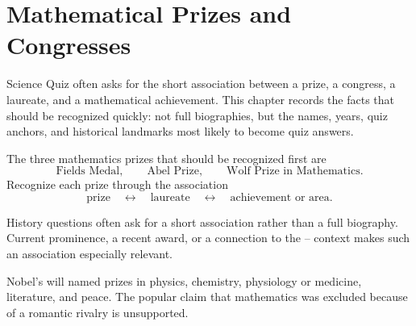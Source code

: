     \chapter{Mathematical Prizes and Congresses}

    Science Quiz often asks for the short association between a prize, a
    congress, a laureate, and a mathematical achievement. This chapter records
    the facts that should be recognized quickly: not full biographies, but the
    names, years, quiz anchors, and historical landmarks most likely to become quiz
    answers.

    \begin{fact}
        The three mathematics prizes that should be recognized first are
        \[
            \text{Fields Medal},\qquad
            \text{Abel Prize},\qquad
            \text{Wolf Prize in Mathematics}.
        \]
        Recognize each prize through the association
        \[
            \text{prize}
            \quad\longleftrightarrow\quad
            \text{laureate}
            \quad\longleftrightarrow\quad
            \text{achievement or area}.
        \]
    \end{fact}

    \begin{strategy}
        History questions often ask for a short association rather than a full
        biography. Current prominence, a recent award, or a connection to the
        \POSTECH--\KAIST{} context makes such an association especially relevant.
    \end{strategy}

    \begin{fact}
        Nobel's will named prizes in physics, chemistry, physiology or medicine,
        literature, and peace. The popular claim that mathematics was excluded
        because of a romantic rivalry is unsupported.
    \end{fact}

    \vspace{1em}

